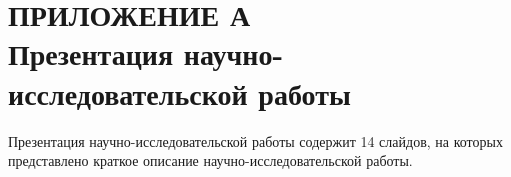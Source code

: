 \documentclass[a4paper,14pt, unknownkeysallowed]{extreport}
\begin{document}
%
%



\renewcommand{\contentsname}{СОДЕРЖАНИЕ} %
\tableofcontents










\chapter*{ПРИЛОЖЕНИЕ А\\Презентация научно-исследовательской работы}
Презентация научно-исследовательской работы содержит 14 слайдов, на которых представлено краткое описание научно-исследовательской работы.

\end{document}

